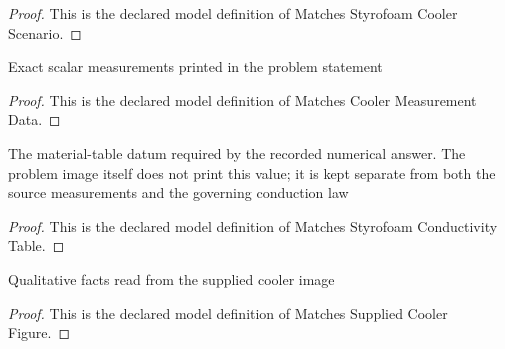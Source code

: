 \begin{proof}
  This is the declared model definition of Matches Styrofoam Cooler Scenario.
\end{proof}
\begin{definition}
  \label{def:physics:phyx-mini-0466:phyxminiproblems-problemphyxmini0466-matchescoolermeasurementdata}
  Exact scalar measurements printed in the problem statement
\end{definition}
\begin{proof}
  This is the declared model definition of Matches Cooler Measurement Data.
\end{proof}
\begin{definition}
  \label{def:physics:phyx-mini-0466:phyxminiproblems-problemphyxmini0466-matchesstyrofoamconductivitytable}
  The material-table datum required by the recorded numerical answer. The problem image itself does not print this value; it is kept separate from both the source measurements and the governing conduction law
\end{definition}
\begin{proof}
  This is the declared model definition of Matches Styrofoam Conductivity Table.
\end{proof}
\begin{definition}
  \label{def:physics:phyx-mini-0466:phyxminiproblems-problemphyxmini0466-matchessuppliedcoolerfigure}
  Qualitative facts read from the supplied cooler image
\end{definition}
\begin{proof}
  This is the declared model definition of Matches Supplied Cooler Figure.
\end{proof}
